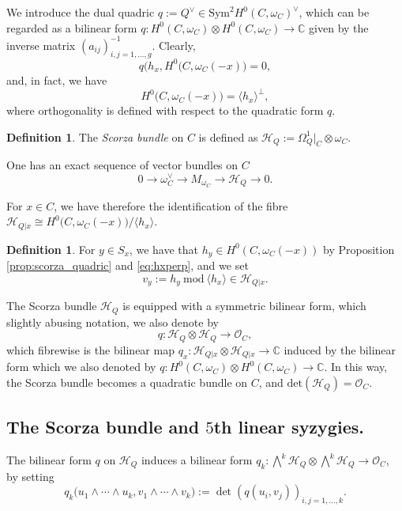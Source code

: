 \documentclass[11pt]{amsart}
\theoremstyle{definition}
\newtheorem{definition}[theorem]{Definition}
\def\OO{\mathcal{O}}
\def\cH{\mathcal{H}}
\begin{document}
\vskip 4pt

We introduce the dual quadric $q:=Q^{\vee}\in \mbox{Sym}^2 H^0(C,\omega_C)^{\vee}$, which can be regarded as a bilinear form $q\colon H^0(C,\omega_C)\otimes H^0(C,\omega_C)\rightarrow \mathbb C$ given by the inverse matrix $(a_{ij})_{i,j=1, \ldots, g}^{-1}$. Clearly, 
$$q\bigl(h_x, H^0(C, \omega_C(-x)\bigr)=0,$$
 and, in fact, we have 
\begin{equation}\label{eq:hxperp}
    H^0(C, \omega_C(-x)\bigr)= \langle h_x\rangle^\perp,
\end{equation}
where orthogonality is defined with respect to the quadratic form $q$. 



\begin{definition}\label{def:quadric_bundle}
 The \emph{Scorza bundle} on $C$ is
defined as  $\cH_Q:=\Omega^1_Q|_C\otimes \omega_C$. 
\end{definition}
One has an exact sequence of vector bundles on $C$
\begin{equation}\label{eq:quadr_bun1}
0\longrightarrow \omega_C^{\vee}\longrightarrow M_{\omega_C}\longrightarrow \cH_Q\longrightarrow 0.
\end{equation}

For $x\in C$, we have therefore the identification of the fibre $\cH_{Q|x}\cong  H^0\bigl(C, \omega_C(-x)\bigr)/\langle h_x\rangle$. 
\begin{definition}\label{def:v_y}
For  $y\in S_x$, we have that $h_y\in H^0(C, \omega_C(-x))$  by Proposition \ref{prop:scorza_quadric} and \eqref{eq:hxperp},
and we set 
$$v_y:=h_y \  \mathrm{mod }\  \langle h_x\rangle \in \cH_{Q|x}.$$
\end{definition}


The  Scorza bundle $\cH_Q$ is equipped with a symmetric bilinear form, which slightly abusing notation, we also denote by $$q\colon \cH_Q\otimes \cH_Q\longrightarrow \OO_C,$$ which fibrewise is the bilinear map $q_x\colon \cH_{Q|x}\otimes \cH_{Q|x}\rightarrow \mathbb C$ induced by the bilinear form which we also denoted by $q\colon H^0(C,\omega_C)\otimes H^0(C,\omega_C)\rightarrow \mathbb C$. In this way, the Scorza bundle becomes a quadratic bundle on $C$, and $\mbox{det}(\mathcal H_Q)=\mathcal O_C$.



\subsection{The Scorza bundle and $5$th linear syzygies.}
The bilinear form $q$ on $\cH_Q$ induces a bilinear form  $q_k\colon \bigwedge^k \cH_Q \otimes \bigwedge^k \cH_Q\rightarrow \OO_C$, by setting 
$$q_k\bigl(u_1\wedge\cdots\wedge u_k, v_1\wedge\cdots\wedge v_k\bigr):=\det(q(u_i,v_j))_{i,j=1, \ldots, k}.
$$
\end{document}

